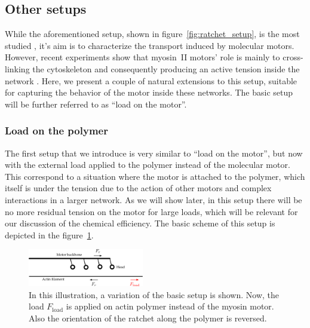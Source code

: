 \documentclass[aps,pre,twocolumn,showpacs,showkeys,superscriptaddress,floatfix]{revtex4-1}
\begin{document}
\subsection{Other setups}
\label{sec:other_setups}
While the aforementioned setup, shown in figure~\ref{fig:ratchet_setup}, is the most studied \cite{reimann2002brownian,astumian1994fluctuation,finer1994single,julicher1997modeling,kishino1988force,peskin1995correlation,saito1994movement},
it's aim is to characterize the transport induced by molecular motors.
However, recent experiments show that myosin~II motors' role is mainly to cross-linking the cytoskeleton 
and consequently producing an active tension inside the network \cite{ma2012nonmuscle}.
Here, we present a couple of natural extensions to this setup, suitable for capturing the behavior of the motor inside these networks.
The basic setup will be further referred to as ``load on the motor''.

\subsubsection{Load on the polymer}
\label{sec:load_on_polymer}
The first setup that we introduce is very similar to ``load on the motor'', 
but now with the external load applied to the polymer instead of the molecular motor. 
This correspond to a situation where the motor is attached to the polymer, which itself is under the tension due to the action of other motors and complex interactions in a larger network.
As we will show later, in this setup there will be no more residual tension on the motor for large loads, which will be relevant for our discussion of the chemical efficiency. 
The basic scheme of this setup is depicted in the figure~\ref{fig:load_on_polymer setup}.
\begin{figure}[t]
\centering
\includegraphics[width=0.45\textwidth,height=!]{load_on_polymer_illustration}
\caption{
\label{fig:load_on_polymer setup}
In this illustration, a variation of the basic setup is shown.  
Now, the load $F_\text{load}$ is applied on actin polymer instead of the myosin motor. Also the orientation of the ratchet along the polymer is reversed.
} 
\end{figure}
\end{document}
